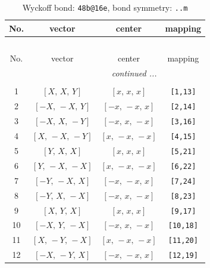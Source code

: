 \documentclass[fleqn,8pt]{jsarticle}
\begin{document}
\renewcommand{\arraystretch}{1.2}
\begin{longtable}{cccc}
\caption{Wyckoff bond: {\tt 48b@16e}, bond symmetry: {\tt ..m}}
 \\
 \hline \hline
No. & vector & center & mapping \\ \hline \endfirsthead

\multicolumn{3}{l}{\tablename\ \thetable{}} \\
 \hline \hline
No. & vector & center & mapping \\ \hline \endhead

 \hline \hline
\multicolumn{3}{r}{\footnotesize\it continued ...} \\ \endfoot

 \hline \hline
\multicolumn{3}{r}{} \\ \endlastfoot

1 & $\left[ X,\, X,\, Y \right]$ & $\left[ x,\, x,\, x \right]$ & {\tt [1,13]} \\ \hline
2 & $\left[ - X,\, - X,\, Y \right]$ & $\left[ - x,\, - x,\, x \right]$ & {\tt [2,14]} \\ \hline
3 & $\left[ - X,\, X,\, - Y \right]$ & $\left[ - x,\, x,\, - x \right]$ & {\tt [3,16]} \\ \hline
4 & $\left[ X,\, - X,\, - Y \right]$ & $\left[ x,\, - x,\, - x \right]$ & {\tt [4,15]} \\ \hline
5 & $\left[ Y,\, X,\, X \right]$ & $\left[ x,\, x,\, x \right]$ & {\tt [5,21]} \\ \hline
6 & $\left[ Y,\, - X,\, - X \right]$ & $\left[ x,\, - x,\, - x \right]$ & {\tt [6,22]} \\ \hline
7 & $\left[ - Y,\, - X,\, X \right]$ & $\left[ - x,\, - x,\, x \right]$ & {\tt [7,24]} \\ \hline
8 & $\left[ - Y,\, X,\, - X \right]$ & $\left[ - x,\, x,\, - x \right]$ & {\tt [8,23]} \\ \hline
9 & $\left[ X,\, Y,\, X \right]$ & $\left[ x,\, x,\, x \right]$ & {\tt [9,17]} \\ \hline
10 & $\left[ - X,\, Y,\, - X \right]$ & $\left[ - x,\, x,\, - x \right]$ & {\tt [10,18]} \\ \hline
11 & $\left[ X,\, - Y,\, - X \right]$ & $\left[ x,\, - x,\, - x \right]$ & {\tt [11,20]} \\ \hline
12 & $\left[ - X,\, - Y,\, X \right]$ & $\left[ - x,\, - x,\, x \right]$ & {\tt [12,19]} \\
\end{longtable}
\renewcommand{\arraystretch}{1.2}
\end{document}

